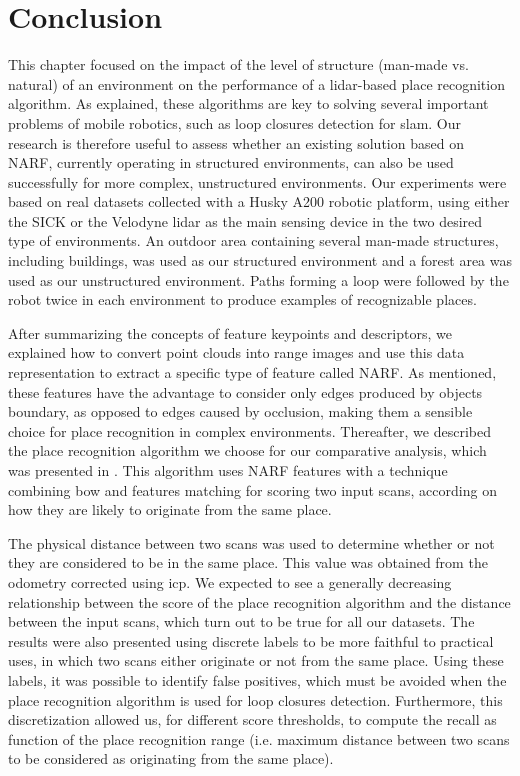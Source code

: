 \section{Conclusion}
\label{sec:chap_slam_conclu}

This chapter focused on the impact of the level of structure (man-made vs. natural) of an environment on the performance of a \gls*{lidar}-based place recognition algorithm. As explained, these algorithms are key to solving several important problems of mobile robotics, such as loop closures detection for \gls*{slam}. Our research is therefore useful to assess whether an existing solution based on NARF, currently operating in structured environments, can also be used successfully for more complex, unstructured environments. Our experiments were based on real datasets collected with a Husky A200 robotic platform, using either the SICK or the Velodyne \gls*{lidar} as the main sensing device in the two desired type of environments. An outdoor area containing several man-made structures, including buildings, was used as our structured environment and a forest area was used as our unstructured environment. Paths forming a loop were followed by the robot twice in each environment to produce examples of recognizable places.

After summarizing the concepts of feature keypoints and descriptors, we explained how to convert point clouds into range images and use this data representation to extract a specific type of feature called NARF. As mentioned, these features have the advantage to consider only edges produced by objects boundary, as opposed to edges caused by occlusion, making them a sensible choice for place recognition in complex environments. Thereafter, we described the place recognition algorithm we choose for our comparative analysis, which was presented in \citep{Steder2011b}. This algorithm uses NARF features with a technique combining \gls*{bow} and features matching for scoring two input scans, according on how they are likely to originate from the same place. 

The physical distance between two scans was used to determine whether or not they are considered to be in the same place. This value was obtained from the odometry corrected using \gls*{icp}. We expected to see a generally decreasing relationship between the score of the place recognition algorithm and the distance between the input scans, which turn out to be true for all our datasets. The results were also presented using discrete labels to be more faithful to practical uses, in which two scans either originate or not from the same place. Using these labels, it was possible to identify false positives, which must be avoided when the place recognition algorithm is used for loop closures detection. Furthermore, this discretization allowed us, for different score thresholds, to compute the recall as function of the place recognition range (i.e. maximum distance between two scans to be considered as originating from the same place).

